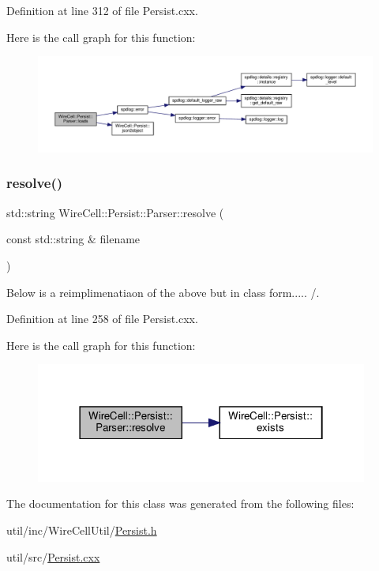Definition at line 312 of file Persist.\+cxx.

Here is the call graph for this function\+:
\nopagebreak
\begin{figure}[H]
\begin{center}
\leavevmode
\includegraphics[width=350pt]{class_wire_cell_1_1_persist_1_1_parser_a3438a15f2e7c437d5c931348f1f1a29f_cgraph}
\end{center}
\end{figure}
\mbox{\label{class_wire_cell_1_1_persist_1_1_parser_ac4af87e2df81644df5e76f498831dba6}} 
\subsubsection{\texorpdfstring{resolve()}{resolve()}}
{\footnotesize\ttfamily std\+::string Wire\+Cell\+::\+Persist\+::\+Parser\+::resolve (\begin{DoxyParamCaption}\item[{const std\+::string \&}]{filename }\end{DoxyParamCaption})}



Below is a reimplimenatiaon of the above but in class form..... /. 



Definition at line 258 of file Persist.\+cxx.

Here is the call graph for this function\+:
\nopagebreak
\begin{figure}[H]
\begin{center}
\leavevmode
\includegraphics[width=310pt]{class_wire_cell_1_1_persist_1_1_parser_ac4af87e2df81644df5e76f498831dba6_cgraph}
\end{center}
\end{figure}


The documentation for this class was generated from the following files\+:\begin{DoxyCompactItemize}
\item 
util/inc/\+Wire\+Cell\+Util/\hyperlink{_persist_8h}{Persist.\+h}\item 
util/src/\hyperlink{_persist_8cxx}{Persist.\+cxx}\end{DoxyCompactItemize}
